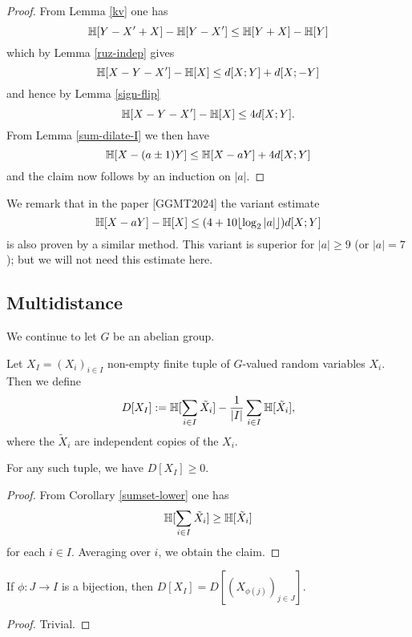 \begin{proof} From Lemma \ref{kv} one has
  $$ \mathbb{H}[Y-X'+X] - \mathbb{H}[Y-X'] \leq \mathbb{H}[Y+X] - \mathbb{H}[Y]$$
  which by Lemma \ref{ruz-indep} gives
  $$ \mathbb{H}[X-Y-X'] -\mathbb{H}[X] \leq d[X;Y] + d[X;-Y]$$
  and hence by Lemma \ref{sign-flip}
  $$ \mathbb{H}[X-Y-X'] -\mathbb{H}[X] \leq 4d[X;Y].$$
  From Lemma \ref{sum-dilate-I} we then have
  $$\mathbb{H}[X-(a\pm 1)Y] \leq \mathbb{H}[X-aY] + 4 d[X;Y]$$
and the claim now follows by an induction on $|a|$.
\end{proof}

We remark that in the paper [GGMT2024] the variant estimate
$$\mathbb{H}[X-aY] - \mathbb{H}[X] \leq (4 + 10 \lfloor \log_2 |a| \rfloor) d[X;Y]$$
is also proven by a similar method.  This variant is superior for $|a| \geq 9$ (or $|a|=7$); but we will not need this estimate here.



\subsection{Multidistance}

We continue to let $G$ be an abelian group.

\begin{definition}[Multidistance]\label{multidist-def}  Let $X_I = (X_i)_{i \in I}$ non-empty finite tuple of $G$-valued random variables $X_i$. Then we define
\[
  D[X_{I}] := \mathbb{H}[\sum_{i \in I} \tilde X_i] - \frac{1}{|I|} \sum_{i \in I} \mathbb{H}[\tilde X_i],
\]
where the $\tilde X_i$ are independent copies of the $X_i$.
\end{definition}

\begin{lemma}[Nonnegativity]\label{multidist-nonneg}  For any such tuple, we have $D[X_I] \geq 0$.
\end{lemma}

\begin{proof}  From Corollary \ref{sumset-lower} one has
$$ \mathbb{H}[\sum_{i \in I} \tilde X_i] \geq \mathbb{H}[\tilde X_i]$$
for each $i \in I$.  Averaging over $i$, we obtain the claim.
\end{proof}

\begin{lemma}[Relabeling]\label{multidist-perm} If $\phi: J \to I$ is a bijection, then $D[X_I] = D[(X_{\phi(j)})_{j \in J}]$.
\end{lemma}

\begin{proof} Trivial.
\end{proof}


